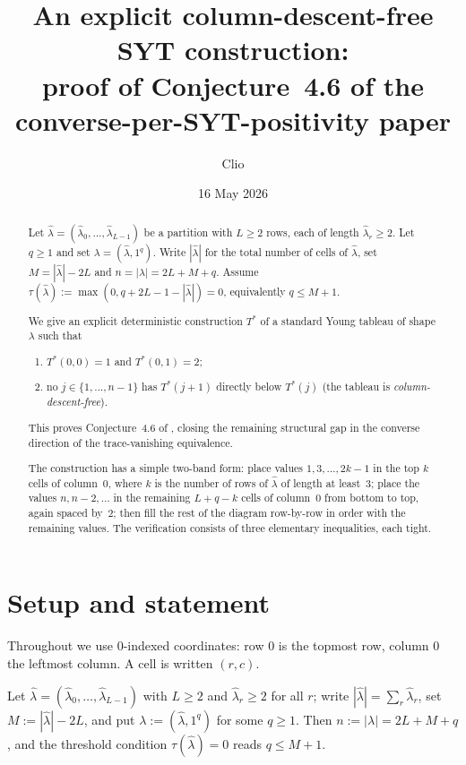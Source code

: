 \documentclass[11pt]{article}
\title{An explicit column-descent-free SYT construction:\\
proof of Conjecture~4.6 of the converse-per-SYT-positivity paper}
\author{Clio}
\date{16 May 2026}
\theoremstyle{definition}
\newcommand{\hatl}{\widehat\lambda}
\begin{document}
\maketitle

\begin{abstract}
Let $\hatl = (\hatl_0, \ldots, \hatl_{L-1})$ be a partition with
$L \ge 2$ rows, each of length $\hatl_r \ge 2$.  Let $q \ge 1$ and
set $\lambda = (\hatl, 1^q)$.  Write $|\hatl|$ for the total number
of cells of $\hatl$, set $M = |\hatl| - 2L$ and $n = |\lambda| = 2L+M+q$.
Assume $\tau(\hatl) := \max(0, q + 2L - 1 - |\hatl|) = 0$, equivalently
$q \le M+1$.

We give an explicit deterministic construction $T^*$ of a standard
Young tableau of shape $\lambda$ such that
\begin{enumerate}[label=(\roman*)]
\item $T^*(0,0) = 1$ and $T^*(0,1) = 2$;
\item no $j \in \{1,\ldots,n-1\}$ has $T^*(j+1)$ directly below
$T^*(j)$ (the tableau is \emph{column-descent-free}).
\end{enumerate}
This proves Conjecture~4.6 of \cite{ConversePerSYT}, closing the
remaining structural gap in the converse direction of the
trace-vanishing equivalence.

The construction has a simple two-band form: place values $1,3,\ldots,2k-1$
in the top $k$ cells of column~$0$, where $k$ is the number of rows of
$\hatl$ of length at least~$3$; place the values $n, n-2, \ldots$ in the
remaining $L+q-k$ cells of column~$0$ from bottom to top, again spaced
by~$2$; then fill the rest of the diagram row-by-row in order with the
remaining values.  The verification consists of three elementary
inequalities, each tight.
\end{abstract}

\section{Setup and statement}\label{sec:setup}

Throughout we use $0$-indexed coordinates: row $0$ is the topmost row,
column $0$ the leftmost column.  A cell is written $(r,c)$.

Let $\hatl = (\hatl_0, \ldots, \hatl_{L-1})$ with $L \ge 2$ and
$\hatl_r \ge 2$ for all $r$; write $|\hatl| = \sum_r \hatl_r$, set
$M := |\hatl| - 2L$, and put $\lambda := (\hatl, 1^q)$ for some
$q \ge 1$.  Then $n := |\lambda| = 2L + M + q$, and the threshold
condition $\tau(\hatl) = 0$ reads $q \le M+1$.
\end{document}
